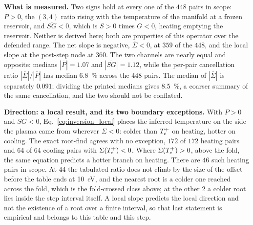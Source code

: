 \textbf{What is measured.} Two signs hold at every one of the $448$ pairs in
scope: $\overline{P} > 0$, the $(3,4)$ ratio rising with the temperature of the
manifold at a frozen reservoir, and $\overline{SG} < 0$, which is $S > 0$
times $G < 0$, heating emptying the reservoir. Neither is derived here; both
are properties of this operator over the defended range. The net slope is
negative, $\overline{\Sigma} < 0$, at $359$ of the $448$, and the local slope
at the post-step node at $360$. The two channels are nearly equal and
opposite: medians $|\overline{P}| = 1.07$ and $|\overline{SG}| = 1.12$, while the
per-pair cancellation ratio $|\overline{\Sigma}|/|\overline{P}|$ has median
\SI{6.8}{\percent} across the $448$ pairs. The median of $|\overline{\Sigma}|$
is separately $0.091$; dividing the printed medians gives \SI{8.5}{\percent},
a coarser summary of the same cancellation, and the two should not be
conflated.

\textbf{Direction: a local result, and its two boundary exceptions.} With
$P > 0$ and $SG < 0$, Eq.~\eqref{eq:inversion_local} places the inferred
temperature on the side the plasma came from wherever $\Sigma < 0$: colder
than $T_e^{+}$ on heating, hotter on cooling. The exact root-find agrees with
no exception, $172$ of $172$ heating pairs and $64$ of $64$ cooling pairs with
$\Sigma(T_e^{+}) < 0$. Where $\Sigma(T_e^{+}) > 0$, above the fold, the same
equation predicts a hotter branch on heating. There are $46$ such heating
pairs in scope. At $44$ the tabulated ratio does not climb by the size of the
offset before the table ends at \SI{10}{\electronvolt}, and the nearest root
is a colder one reached across the fold, which is the fold-crossed class
above; at the other $2$ a colder root lies inside the step interval itself. A
local slope predicts the local direction and not the existence of a root over
a finite interval, so that last statement is empirical and belongs to this
table and this step.

